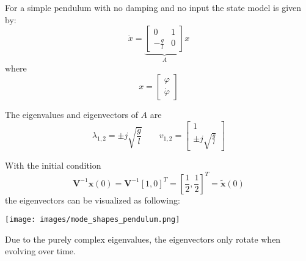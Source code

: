 \begin{examplesection}
    For a simple pendulum with no damping and no input the state model is given by:
    \begin{equation*}
        \dot{x}=\underbrace{\begin{bmatrix}
                0            & 1  \\
                -\frac{g}{l} & 0
            \end{bmatrix}}_{A}x
    \end{equation*}
    where
    \begin{equation*}
        x=\begin{bmatrix}
            \varphi \\
            \dot{\varphi}
        \end{bmatrix}
    \end{equation*}
    
    The eigenvalues and eigenvectors of $A$ are
    \begin{equation*}
        \lambda_{1,2} = \pm j \sqrt{\frac{g}{l}} \qquad v_{1,2}=\begin{bmatrix}
            1 \\
            \pm j \sqrt{\frac{g}{l}}
        \end{bmatrix}
    \end{equation*}
    
    With the initial condition
    \noindent\begin{equation*}
        \mathbf{V}^{-1}\mathbf{x}(0) = \mathbf{V}^{-1}{[1, 0]}^T = {\left[\frac{1}{2}, \frac{1}{2}\right]}^T = \tilde{\mathbf{x}}(0)
    \end{equation*}
    the eigenvectors can be visualized as following:
    
    \texttt{[image: images/mode\_shapes\_pendulum.png]}
    
    Due to the purely complex eigenvalues, the eigenvectors only rotate when evolving over time.
    

\end{examplesection}
